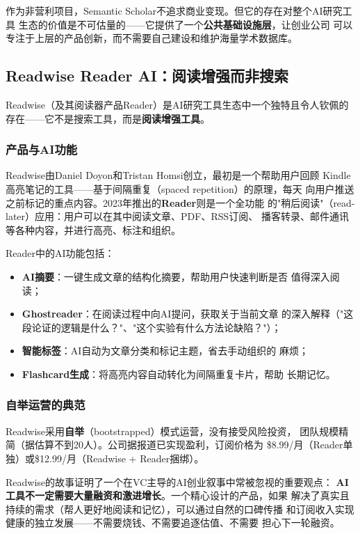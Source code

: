 作为非营利项目，Semantic Scholar不追求商业变现。但它的存在对整个AI研究工具
生态的价值是不可估量的——它提供了一个\textbf{公共基础设施层}，让创业公司
可以专注于上层的产品创新，而不需要自己建设和维护海量学术数据库。

\subsection{Readwise Reader AI：阅读增强而非搜索}
\label{subsec:readwise}

Readwise（及其阅读器产品Reader）是AI研究工具生态中一个独特且令人钦佩的
存在——它不是搜索工具，而是\textbf{阅读增强工具}。

\subsubsection{产品与AI功能}
Readwise由Daniel Doyon和Tristan Homsi创立，最初是一个帮助用户回顾
Kindle高亮笔记的工具——基于间隔重复（spaced repetition）的原理，每天
向用户推送之前标记的重点内容。2023年推出的\textbf{Reader}则是一个全功能
的"稍后阅读"（read-later）应用：用户可以在其中阅读文章、PDF、RSS订阅、
播客转录、邮件通讯等各种内容，并进行高亮、标注和组织。

Reader中的AI功能包括：

\begin{itemize}
  \item \textbf{AI摘要}：一键生成文章的结构化摘要，帮助用户快速判断是否
    值得深入阅读；
  \item \textbf{Ghostreader}：在阅读过程中向AI提问，获取关于当前文章
    的深入解释（"这段论证的逻辑是什么？"、"这个实验有什么方法论缺陷？"）；
  \item \textbf{智能标签}：AI自动为文章分类和标记主题，省去手动组织的
    麻烦；
  \item \textbf{Flashcard生成}：将高亮内容自动转化为间隔重复卡片，帮助
    长期记忆。
\end{itemize}

\subsubsection{自举运营的典范}
Readwise采用\textbf{自举}（bootstrapped）模式运营，没有接受风险投资，
团队规模精简（据估算不到20人）。公司据报道已实现盈利，订阅价格为
\$8.99/月（Reader单独）或\$12.99/月（Readwise + Reader捆绑）。

Readwise的故事证明了一个在VC主导的AI创业叙事中常被忽视的重要观点：
\textbf{AI工具不一定需要大量融资和激进增长}。一个精心设计的产品，如果
解决了真实且持续的需求（帮人更好地阅读和记忆），可以通过自然的口碑传播
和订阅收入实现健康的独立发展——不需要烧钱、不需要追逐估值、不需要
担心下一轮融资。

